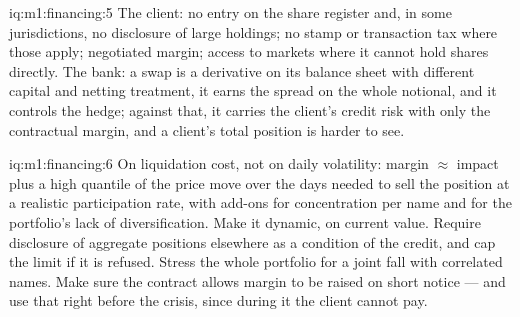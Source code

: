 \begin{solution}{iq:m1:financing:5}
The client: no entry on the share register and, in some jurisdictions, no
disclosure of large holdings; no stamp or transaction tax where those apply;
negotiated margin; access to markets where it cannot hold shares directly.
The bank: a swap is a derivative on its balance sheet with different capital
and netting treatment, it earns the spread on the whole notional, and it
controls the hedge; against that, it carries the client's credit risk with
only the contractual margin, and a client's total position is harder to see.
\end{solution}

\begin{solution}{iq:m1:financing:6}
On liquidation cost, not on daily volatility: margin $\approx$ impact plus a
high quantile of the price move over the days needed to sell the position at
a realistic participation rate, with add-ons for concentration per name and
for the portfolio's lack of diversification. Make it dynamic, on current
value. Require disclosure of aggregate positions elsewhere as a condition of
the credit, and cap the limit if it is refused. Stress the whole portfolio
for a joint fall with correlated names. Make sure the contract allows margin
to be raised on short notice --- and use that right before the crisis, since
during it the client cannot pay.
\end{solution}
